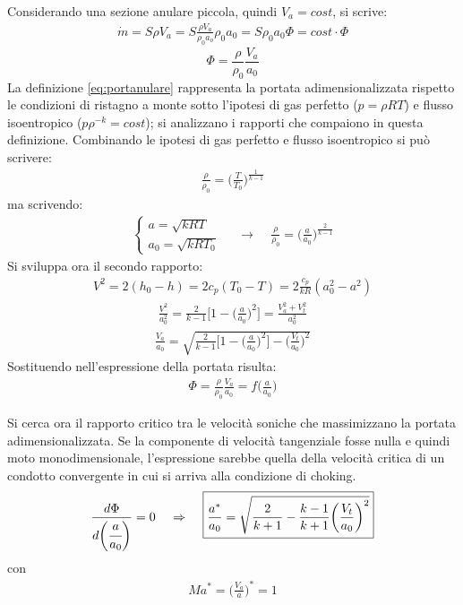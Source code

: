Considerando una sezione anulare piccola, quindi $V_a = cost$, si scrive:
\begin{align*}
\dot{m} = S \rho V_a = S \frac{\rho V_a}{\rho_0 a_o}\rho_0 a_0 = S \rho_0 a_0 \Phi = cost \cdot \Phi
\end{align*}
\begin{equation}\label{eq:portanulare}
\Phi = \frac{\rho}{\rho_0} \frac{V_a}{a_0}
\end{equation}
La definizione \ref{eq:portanulare} rappresenta la portata adimensionalizzata rispetto le condizioni di ristagno a monte sotto l'ipotesi di gas perfetto ($p = \rho RT$) e flusso isoentropico ($p \rho^{-k} = cost$); si analizzano i rapporti che compaiono in questa definizione. Combinando le ipotesi di gas perfetto e flusso isoentropico si può scrivere:
\begin{align*}
\frac{\rho}{\rho_0} = \bigg( \frac{T}{T_0} \bigg)^{\frac{1}{k-1}} 
\end{align*}
ma scrivendo:
\begin{align*}
\begin{cases}
a = \sqrt{kRT}\\
a_0 = \sqrt{kRT_0}
\end{cases}
\;\;\;\; \rightarrow \;\;\;\; \frac{\rho}{\rho_0} = \bigg( \frac{a}{a_0} \bigg)^{\frac{2}{k-1}}
\end{align*}
Si sviluppa ora il secondo rapporto:
\begin{align*}
V^2 = 2 (h_0 - h) = 2 c_p (T_0 - T) = 2 \frac{c_p}{kR} (a_0^2 - a^2)
\end{align*}
\begin{align*}
\frac{V^2}{a_0^2} = \frac{2}{k-1} \bigg[ 1- \bigg( \frac{a}{a_0} \bigg)^2 \bigg] = \frac{V_a^2 + V_t^2}{a_0^2}
\end{align*}
\begin{align*}
\frac{V_a}{a_0} = \sqrt{\frac{2}{k-1} \bigg[ 1- \bigg( \frac{a}{a_0} \bigg)^2 \bigg] - \bigg( \frac{V_t}{a_0} \bigg)^2}
\end{align*}
Sostituendo nell'espressione della portata risulta:
\begin{align*}
\Phi = \frac{\rho}{\rho_0} \frac{V_a}{a_0} = f \bigg( \frac{a}{a_0} \bigg)
\end{align*}

Si cerca ora il rapporto critico tra le velocità soniche che massimizzano la portata adimensionalizzata. Se la componente di velocità tangenziale fosse nulla e quindi moto monodimensionale, l'espressione sarebbe quella della velocità critica di un condotto convergente in cui si arriva alla condizione di choking.
\begin{align*}
\frac{d\Phi}{d \bigg( \cfrac{a}{a_0} \bigg)}=0 \;\;\;\; \Rightarrow \;\;\;\; \boxed{ \frac{a^*}{a_0} = \sqrt{\frac{2}{k+1} - \frac{k-1}{k+1} \bigg( \frac{V_t}{a_0} \bigg)^2} }
\end{align*}
con
\begin{align*}
Ma^* = \bigg( \frac{V_a}{a} \bigg)^* = 1
\end{align*}

